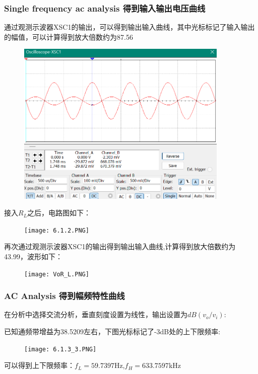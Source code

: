 \documentclass[a4paper,11pt,UTF8]{article}
\numberwithin{equation}{subsection}
\begin{document}
\subsubsection{Single frequency ac analysis 得到输入输出电压曲线}
通过观测示波器XSC1的输出，可以得到输出输入曲线，其中光标标记了输入输出的幅值，可以计算得到放大倍数约为87.56
\begin{figure}[H]
	\centering
	\includegraphics[width=0.9\textwidth]{2.6.PNG}	
\end{figure}
接入$R_L$之后，电路图如下：
\begin{figure}[H]
	\centering
	\texttt{[image: 6.1.2.PNG]}	
\end{figure}
再次通过观测示波器XSC1的输出得到输出输入曲线,计算得到放大倍数约为43.99，波形如下：
\begin{figure}[H]
\centering
\texttt{[image: VoR\_L.PNG]}	
\end{figure}
\subsubsection{AC Analysis 得到幅频特性曲线}
在分析中选择交流分析，垂直刻度设置为线性，输出设置为$dB(v_o/v_i)$:
\begin{figure}[H]
\end{figure}
已知通频带增益为38.5209左右，下图光标标记了-3dB处的上下限频率:
\begin{figure}[H]
	\centering
	\texttt{[image: 6.1.3\_3.PNG]}	
\end{figure}
可以得到上下限频率：$f_L=59.7397$Hz,$f_H=633.7597$kHz
\end{document}
